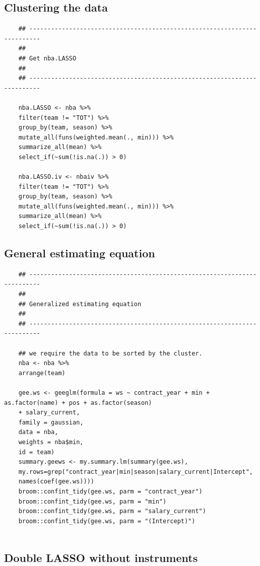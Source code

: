 \documentclass[12pt]{article}
\begin{document}
	\subsection{Clustering the data}
	
	\begin{lstlisting}
	## -------------------------------------------------------------------------
	##
	## Get nba.LASSO
	##
	## -------------------------------------------------------------------------
	
	nba.LASSO <- nba %>%
	filter(team != "TOT") %>%
	group_by(team, season) %>%
	mutate_all(funs(weighted.mean(., min))) %>%
	summarize_all(mean) %>%
	select_if(~sum(!is.na(.)) > 0)
	
	nba.LASSO.iv <- nbaiv %>%
	filter(team != "TOT") %>%
	group_by(team, season) %>%
	mutate_all(funs(weighted.mean(., min))) %>%
	summarize_all(mean) %>%
	select_if(~sum(!is.na(.)) > 0)
	\end{lstlisting}
	
	\subsection{General estimating equation}
	
	\begin{lstlisting}
	## -------------------------------------------------------------------------
	##
	## Generalized estimating equation
	##
	## -------------------------------------------------------------------------
	
	## we require the data to be sorted by the cluster.
	nba <- nba %>%
	arrange(team)
	
	gee.ws <- geeglm(formula = ws ~ contract_year + min + as.factor(name) + pos + as.factor(season) 
	+ salary_current,
	family = gaussian,
	data = nba,
	weights = nba$min,
	id = team)
	summary.geews <- my.summary.lm(summary(gee.ws), 
	my.rows=grep("contract_year|min|season|salary_current|Intercept",
	names(coef(gee.ws))))
	broom::confint_tidy(gee.ws, parm = "contract_year")
	broom::confint_tidy(gee.ws, parm = "min")
	broom::confint_tidy(gee.ws, parm = "salary_current")
	broom::confint_tidy(gee.ws, parm = "(Intercept)")
	
	\end{lstlisting}
	
	
	\subsection{Double LASSO without instruments}
	
\end{document}
